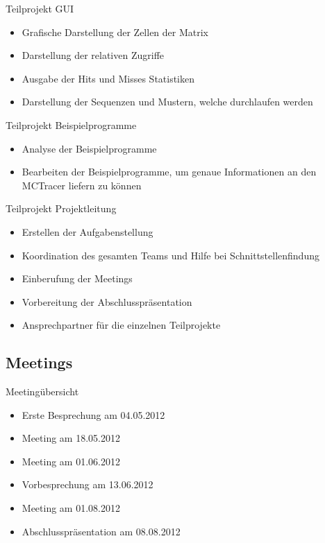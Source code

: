 \begin{frame}
\begin{block}{Teilprojekt GUI}
\begin{itemize}[<+->]
\pause\item Grafische Darstellung der Zellen der Matrix
\item Darstellung der relativen Zugriffe
\item Ausgabe der Hits und Misses Statistiken
\item Darstellung der Sequenzen und Mustern, welche durchlaufen werden
\end{itemize}
\end{block}
\end{frame}

\begin{frame}
\begin{block}{Teilprojekt Beispielprogramme}
\begin{itemize}[<+->]
\pause\item Analyse der Beispielprogramme
\item Bearbeiten der Beispielprogramme, um genaue Informationen an den MCTracer liefern zu können
\end{itemize}
\end{block}
\end{frame}

\begin{frame}
\begin{block}{Teilprojekt Projektleitung}
\begin{itemize}[<+->]
\pause\item Erstellen der Aufgabenstellung
\item Koordination des gesamten Teams und Hilfe bei Schnittstellenfindung
\item Einberufung der Meetings
\item Vorbereitung der Abschlusspräsentation
\item Ansprechpartner für die einzelnen Teilprojekte
\end{itemize}
\end{block}
\end{frame}

\subsection{Meetings}

\begin{frame}
\begin{block}{Meetingübersicht}
\begin{itemize}[<+->]
\pause\item Erste Besprechung am 04.05.2012
\item Meeting am 18.05.2012
\item Meeting am 01.06.2012
\item Vorbesprechung am 13.06.2012
\item Meeting am 01.08.2012
\item Abschlusspräsentation am 08.08.2012
\end{itemize}
\end{block}
\end{frame}
